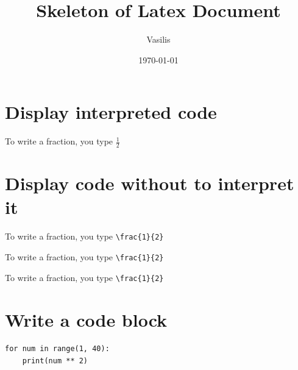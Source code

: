 \documentclass{article}
\title{Skeleton of Latex Document}
\author{Vasilis}
\date{\today}
\begin{document}
\maketitle

\section{Display interpreted code}
To write a fraction, you type $\frac{1}{2}$

\section{Display code without to interpret it}
To write a fraction, you type \verb+\frac{1}{2}+

To write a fraction, you type \verb|\frac{1}{2}|

To write a fraction, you type \verb?\frac{1}{2}?

\section{Write a code block}
\begin{verbatim}
for num in range(1, 40):
	print(num ** 2)
\end{verbatim}
\end{document}
